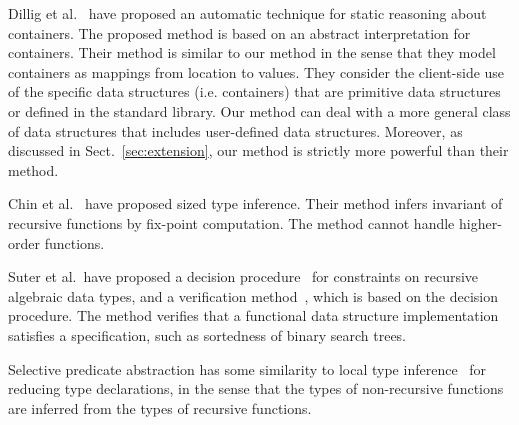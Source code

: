Dillig et al.~\cite{Dillig2011} have proposed an automatic technique for
static reasoning about containers.  The proposed method is based on an
abstract interpretation for containers.  Their method is similar to our
method in the sense that they model containers as mappings from location
to values.  They consider the client-side use of the specific data
structures (i.e. containers) that are primitive data structures or
defined in the standard library.  Our method can deal with a more
general class of data structures that includes user-defined data
structures.  Moreover, as discussed in Sect.~\ref{sec:extension}, our
method is strictly more powerful than their method.

Chin et al.~\cite{Chin2003} have proposed sized type inference.  Their
method infers invariant of recursive functions by fix-point
computation.  The method cannot handle higher-order functions.

Suter et al.~have proposed a decision procedure~\cite{Suter2010} for
constraints on recursive algebraic data types, and a verification
method~\cite{Suter2011}, which is based on the
decision procedure.  The method verifies that a functional data
structure implementation satisfies a specification, such as sortedness
of binary search trees.

Selective predicate abstraction has some similarity to local type
inference~\cite{Pierce2000} for reducing type declarations, in the sense
that the types of non-recursive functions are inferred from the types of
recursive functions.
